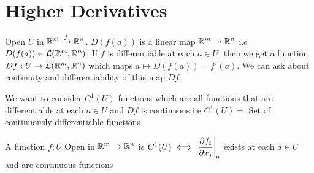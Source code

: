 \chapter{Higher Derivatives}
Open $U$ in $\mathbb{R}^m\xrightarrow{f}\mathbb{R}^n$. $D(f(a))$ is a linear map $\mathbb{R}^m\to \mathbb{R}^n$ i.e $D(f(a))\in \mathcal{L}(\mathbb{R}^m,\mathbb{R}^n)$. If $f$ is differentiable at each $a\in U$, then we get a function $Df:{U\to\mathcal{L}(\mathbb{R}^m,\mathbb{R}^n)}$  which maps $a\longmapsto D(f(a))=f'(a)$. We can ask about continuity and differentiability of this map $Df$.

We want to consider $C^1(U)$ functions which are all functions that are differentiable at each $a\in U$ and $Df$ is continuous i.e $C^1(U)=$ Set of continuously differentiable functions
\begin{Theorem}{}{}
A function $f:U$ Open in $\mathbb{R}^m\to \mathbb{R}^n$ is $C^1(U)\iff \left.\dfrac{\partial f_i}{\partial x_j}\right|_a$ exists at each $a\in U$ and are continuous functions
\end{Theorem}
